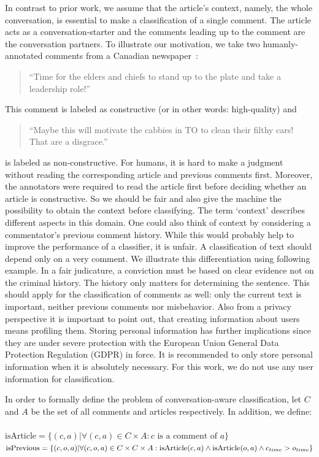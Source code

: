 In contrast to prior work, we assume that the article's context, namely, the whole conversation, is essential to make a classification of a single comment. The article acts as a conversation-starter and the comments leading up to the comment are the conversation partners. To illustrate our motivation, we take two humanly-annotated comments from a Canadian newspaper~\cite{kolhatkar2018sfu}:

\begin{quote}
    ``Time for the elders and chiefs to stand up to the plate and take a leadership role!''
 \end{quote}

This comment is labeled as constructive (or in other words: high-quality) and
\begin{quote}
    ``Maybe this will motivate the cabbies in TO to clean their filthy cars! That are a disgrace.''
\end{quote}

is labeled as non-constructive. For humans, it is hard to make a judgment without reading the corresponding article and previous comments first. Moreover, the annotators were required to read the article first before deciding whether an article is constructive. So we should be fair and also give the machine the possibility to obtain the context before classifying.
The term `context' describes different aspects in this domain.
One could also think of context by considering a commentator's previous comment history.
While this would probably help to improve the performance of a classifier, it is unfair.
A classification of text should depend only on a very comment.
We illustrate this differentiation using following example.
In a fair judicature, a conviction must be based on clear evidence not on the criminal history.
The history only matters for determining the sentence.
This should apply for the classification of comments as well: only the current text is important, neither previous comments nor misbehavior.
Also from a privacy perspective it is important to point out, that creating information about users means profiling them.
Storing personal information has further implications since they are under severe protection with the European Union General Data Protection Regulation (GDPR) in force.
It is recommended to only store personal information when it is absolutely necessary.
For this work, we do not use any user information for classification.

In order to formally define the problem of conversation-aware classification, let $C$ and $A$ be the set of all comments and articles respectively.
In addition, we define:
\\\\
$\text{isArticle}=\{(c, a)| \forall (c,a) \in C \times A: c\text{ is a comment of }a\}$
\\
$\text{isPrevious}=\{(c, o, a)| \forall (c,o, a) \in C \times C \times A:\text{isArticle(}c, a\text{)} \wedge \text{isArticle(}o, a\text{)} \wedge \\  c_{time} > o_{time}\}$

